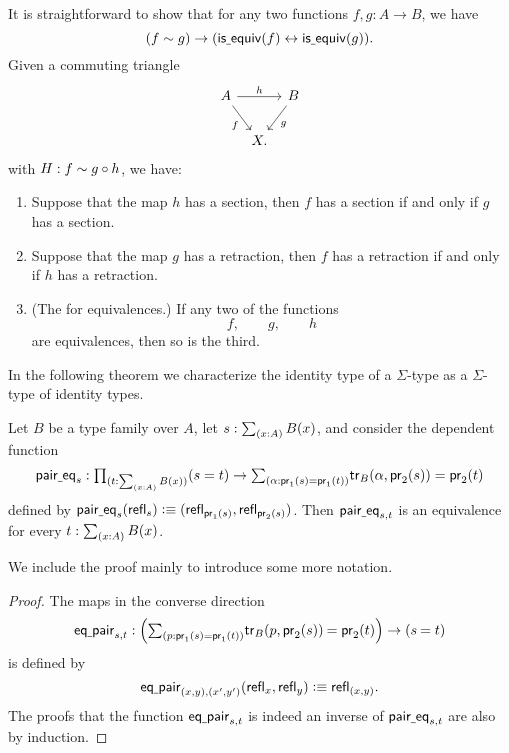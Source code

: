It is straightforward to show that for any two functions $f,g:A\to B$, we have
\begin{equation*}
(f\sim g)\to (\mathsf{is\underline{\ }{}equiv}(f)\leftrightarrow\mathsf{is\underline{\ }{}equiv}(g)).
\end{equation*}
Given a commuting triangle
\begin{equation*}
\begin{tikzcd}[column sep=tiny]
A \arrow[rr,"h"] \arrow[dr,swap,"f"] & & B \arrow[dl,"g"] \\
& X.
\end{tikzcd}
\end{equation*}
with $H:f\sim g\circ h$, we have:
\begin{enumerate}
\item Suppose that the map $h$ has a section, then $f$ has a section if and only if $g$ has a section.
\item Suppose that the map $g$ has a retraction, then $f$ has a retraction if and only if $h$ has a retraction.
\item (The  for equivalences.) If any two of the functions
\begin{equation*}
f,\qquad g,\qquad h
\end{equation*}
are equivalences, then so is the third.
\end{enumerate}

In the following theorem we characterize the identity type of a $\Sigma$-type as a $\Sigma$-type of identity types.


\begin{prp}\label{thm:eq_sigma}
Let $B$ be a type family over $A$, let $s:\sm{x:A}B(x)$, and consider the dependent function
\begin{equation*}
\mathsf{pair\usc{}eq}_s:\prd{t:\sm{x:A}B(x)} (s=t)\to \sm{\alpha:\proj 1(s)=\proj 1(t)} \mathsf{tr}_B(\alpha,\proj 2(s))=\proj 2(t)
\end{equation*}
defined by $\mathsf{pair\underline{\ }{}eq}_s(\mathsf{refl}_{s}) \vcentcolon\equiv (\mathsf{refl}_{\mathsf{pr}_{1}(s)},\mathsf{refl}_{\mathsf{pr}_{2}(s)})$. Then $\mathsf{pair\underline{\ }{}eq}_{s,t}$ is an equivalence for every $t:\sm{x:A}B(x)$.
\end{prp}

We include the proof mainly to introduce some more notation.

\begin{proof}
The maps in the converse direction
\begin{equation*}
\mathsf{eq\usc{}pair}_{s,t} : \Big(\sm{p:\proj 1(s)=\proj 1(t)}\id{\mathsf{tr}_B(p,\proj 2(s))}{\proj 2(t)}\Big)\to(\id{s}{t})
\end{equation*}
is defined by
\begin{equation*}
\mathsf{eq\underline{\ }{}pair}_{(x,y),(x',y')}(\mathsf{refl}_{x},\mathsf{refl}_{y})\vcentcolon\equiv \mathsf{refl}_{(x,y)}.
\end{equation*}
The proofs that the function $\mathsf{eq\underline{\ }{}pair}_{s,t}$ is indeed an inverse of $\mathsf{pair\underline{\ }{}eq}_{s,t}$ are also by induction.
\end{proof}

